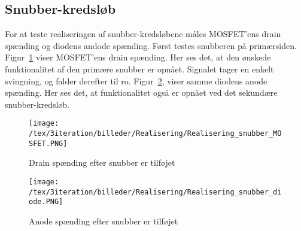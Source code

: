 
\subsection{Snubber-kredsløb}
For at teste realiseringen af snubber-kredsløbene måles MOSFET'ens drain spænding og diodens andode spænding. Først testes snubberen på primærsiden. Figur~\ref{fig:realiseirng_snubber_MOSFET_3} viser MOSFET'ens drain spænding. Her ses det, at den ønskede funktionalitet af den primære snubber er opnået. Signalet tager en enkelt svingning, og falder derefter til ro. Figur~\ref{fig:realiseirng_snubber_diode_3}, viser samme diodens anode spænding. Her ses det, at funktionalitet også er opnået ved det sekundære snubber-kredsløb. 

\begin{figure}[H]
	\center
	\texttt{[image: /tex/3iteration/billeder/Realisering/Realisering\_snubber\_MOSFET.PNG]}
	\caption{Drain spænding efter snubber er tilføjet}
	\label{fig:realiseirng_snubber_MOSFET_3}
\end{figure} 

\begin{figure}[H]
	\center
	\texttt{[image: /tex/3iteration/billeder/Realisering/Realisering\_snubber\_diode.PNG]}
	\caption{Anode spænding efter snubber er tilføjet}
	\label{fig:realiseirng_snubber_diode_3}
\end{figure} 

